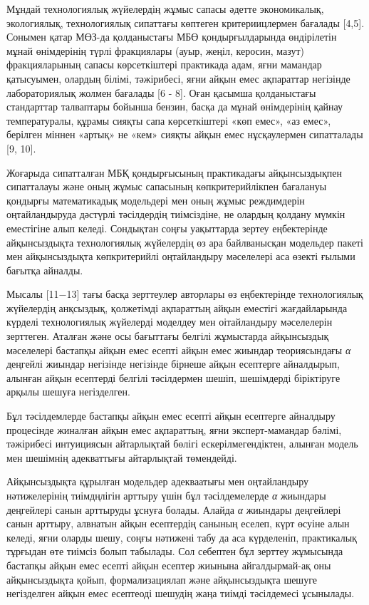 Мұндай технологиялық жүйелердің жұмыс сапасы әдетте экономикалық,
экологиялық, технологиялық сипаттағы көптеген критериицлермен бағалады
{[}4,5{]}. Сонымен қатар МӨЗ-да қолданыстағы МБӨ қондырғылдарында
өндірілетін мұнай өнімдерінің түрлі фракциялары (ауыр, жеңіл, керосин,
мазут) фракцияларының сапасы көрсеткіштері практикада адам, яғни
мамандар қатысуымен, олардың білімі, тәжірибесі, яғни айқын емес
ақпараттар негізінде лабораториялық жолмен бағалады {[}6 - 8{]}. Оған
қасымша қолданыстағы стандарттар талваптары бойынша бензин, басқа да
мұнай өнімдерінің қайнау температуралы, құрамы сияқты сапа көрсеткіштері
«көп емес», «аз емес», берілген міннен «артық» не «кем» сияқты айқын
емес нұсқаулермен сипатталады {[}9, 10{]}.

Жоғарыда сипатталған МБҚ қондырғысының практикадағы айқынсыздықпен
сипатталауы және оның жұмыс сапасының көпкритерийлікпен бағалануы
қондырғы математикадық модельдері мен оның жұмыс реждимдерін
оңтайландыруда дәстүрлі тәсілдердің тиімсіздіне, не олардың қолдану
мүмкін еместігіне алып келеді. Сондықтан соңғы уақыттарда зертеу
еңбектерінде айқынсыздықта технологиялық жүйелердің өз ара байлванысқан
модельдер пакеті мен айқынсыздықта көпкритерийлі оңтайландыру мәселелері
аса өзекті ғылыми бағытқа айналды.

Мысалы {[}11−13{]} тағы басқа зерттеулер авторлары өз еңбектерінде
технологиялық жүйелердің анқсыздық, қолжетімді ақпараттың айқын еместігі
жағдайларында күрделі технологиялық жүйелерді моделдеу мен оітайландыру
мәселелерін зерттеген. Аталған және осы бағыттағы белгілі жұмыстарда
айқынсыздық мәселелері бастапқы айқын емес есепті айқын емес жиындар
теориясындағы \emph{α} деңгейлі жиындар негізінде негізінде бірнеше
айқын есептерге айналдырып, алынған айқын есептерді белгілі тәсілдермен
шешіп, шешімдерді біріктіруге арқылы шешуға негізделген.

Бұл тәсілдемлерде бастапқы айқын емес есепті айқын есептерге айналдыру
процесінде жиналған айқын емес ақпараттың, яғни эксперт-мамандар бәлімі,
тәжірибесі интуициясын айтарлықтай бөлігі ескерілмегендіктен, алынған
модель мен шешімнің адекваттығы айтарлықтай төмендейді.

Айқынсыздықта құрылған модельдер адекваатығы мен оңтайландыру
нәтижелерінің тиімдңлігін арттыру үшін бұл тәсілдемелерде \emph{α}
жиындары деңгейлері санын арттыруды ұснуға болады. Алайда \emph{α}
жиындары деңгейлері санын арттыру, алвнатын айқын есептердің санының
еселеп, күрт өсуіне алын келеді, яғни оларды шешу, соңғы нәтижені табу
да аса күрделеніп, практикалық тұрғыдан өте тиімсіз болып табылады. Сол
себептен бұл зерттеу жұмысында бастапқы айқын емес есепті айқын есептер
жиынына айгалдырмай-ақ оны айқынсыздықта қойып, формализациялап және
айқынсыздықта шешуге негізделген айқын емес есептеоді шешудің жаңа
тиімді тәсілдемесі ұсынылады.

